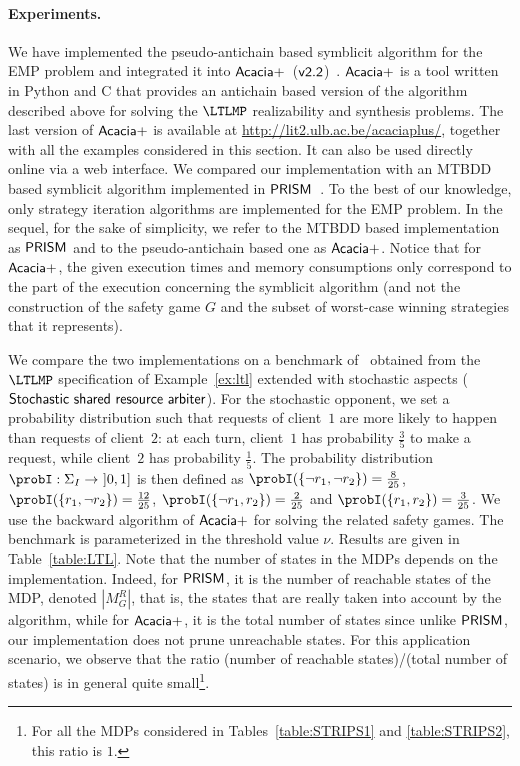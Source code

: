 \paragraph{Experiments.} We have implemented the pseudo-antichain based symblicit algorithm for the EMP problem and integrated it into $\sf{Acacia+}$~($\sf{v2.2}$)~\cite{DBLP:conf/cav/BohyBFJR12}. $\sf{Acacia+}$ is a tool written in Python and C that provides an antichain based version of the algorithm described above for solving the $\LTLMP$ realizability and synthesis problems. The last version of $\sf{Acacia+}$ is available at \url{http://lit2.ulb.ac.be/acaciaplus/}, together with all the examples considered in this section. It can also be used directly online via a web interface. We compared our implementation with an MTBDD based symblicit algorithm implemented in $\sf{PRISM}$~\cite{prismEMP}. To the best of our knowledge, only strategy iteration algorithms are implemented for the EMP problem. In the sequel, for the sake of simplicity, we refer to the MTBDD based implementation as $\sf{PRISM}$ and to the pseudo-antichain based one as $\sf{Acacia+}$. Notice that for $\sf{Acacia+}$, the given execution times and memory consumptions only correspond to the part of the execution concerning the symblicit algorithm (and not the construction of the safety game $G$ and the subset of worst-case winning strategies that it represents).

\medskip
We compare the two implementations on a benchmark of~\cite{DBLP:conf/tacas/BohyBFR13} obtained from the $\LTLMP$ specification of Example~\ref{ex:ltl} extended with stochastic aspects ($\sf{Stochastic~shared~resource~arbiter}$). For the stochastic opponent, we set a probability distribution such that requests of client~$1$ are more likely to happen than requests of client~$2$: at each turn, client~$1$ has probability $\frac{3}{5}$ to make a request, while client~$2$ has probability $\frac{1}{5}$. The probability distribution $\probI : \Sigma_I \rightarrow\ ]0,1]$ is then defined as $\probI(\{\neg r_1, \neg r_2\}) = \frac{8}{25}$, $\probI(\{r_1, \neg r_2\}) = \frac{12}{25}$, $\probI(\{\neg r_1, r_2\}) = \frac{2}{25}$ and $\probI(\{r_1, r_2\}) = \frac{3}{25}$. We use the backward algorithm of $\sf{Acacia+}$ for solving the related safety games. The benchmark is parameterized in the threshold value $\nu$. Results are given in Table~\ref{table:LTL}. Note that the number of states in the MDPs depends on the implementation. Indeed, for $\sf{PRISM}$, it is the number of reachable states of the MDP, denoted $|M_G^R|$, that is, the states that are really taken into account by the algorithm, while for $\sf{Acacia+}$, it is the total number of states since unlike $\sf{PRISM}$, our implementation does not prune unreachable states. For this application scenario, we observe that the ratio (number of reachable states)/(total number of states) is in general quite small\footnote{For all the MDPs considered in Tables~\ref{table:STRIPS1} and \ref{table:STRIPS2}, this ratio is $1$.}. 

